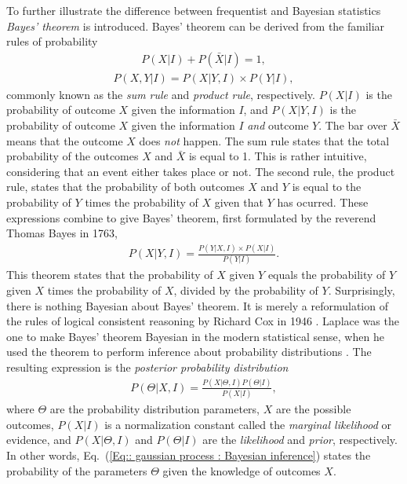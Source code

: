 \documentclass[twoside,english]{uiofysmaster}
\begin{document}
To further illustrate the difference between frequentist and Bayesian statistics \textit{Bayes' theorem} \cite{mr1763essay} is introduced. Bayes' theorem can be derived from the familiar rules of probability
\begin{align}\label{Eq:: Sum rule}
P(X | I) + P(\bar{X} | I) = 1,
\end{align}
\begin{align}\label{Eq:: Product rule}
P(X, Y | I) = P(X | Y, I) \times P(Y | I),
\end{align} 
commonly known as the \textit{sum rule} and \textit{product rule}, respectively. $P(X|I)$ is the probability of outcome $X$ given the information $I$, and $P(X|Y,I)$ is the probability of outcome $X$ given the information $I$ \textit{and} outcome $Y$. The bar over $\bar{X}$ means that the outcome $X$ does \textit{not} happen. The sum rule states that the total probability of the outcomes $X$ and $\bar{X}$ is equal to 1. This is rather intuitive, considering that an event either takes place or not. The second rule, the product rule, states that the probability of both outcomes $X$ and $Y$ is equal to the probability of $Y$ times the probability of $X$ given that $Y$ has ocurred. These expressions combine to give Bayes' theorem, first formulated by the reverend Thomas Bayes in 1763,
\begin{align}\label{Eq:: gaussian process : Bayes theorem}
P(X | Y, I) = \frac{P(Y | X, I) \times P(X | I)}{P(Y | I)}.
\end{align}
This theorem states that the probability of $X$ given $Y$ equals the probability of $Y$ given $X$ times the probability of $X$, divided by the probability of $Y$. Surprisingly, there is nothing Bayesian about Bayes' theorem. It is merely a reformulation of the rules of logical consistent reasoning by Richard Cox in 1946 \cite{sivia2006data}. Laplace was the one to make Bayes' theorem Bayesian in the modern statistical sense, when he used the theorem to perform inference about probability distributions \cite{laplace1820theorie}. The resulting expression is the \textit{posterior probability distribution}
\begin{align}
P(\Theta | X , I) = \frac{P(X|\Theta, I) P(\Theta| I)}{P(X | I)},\label{Eq:: gaussian process : Bayesian inference}
\end{align}
where $\Theta$ are the probability distribution parameters, $X$ are the possible outcomes, $P(X|I)$ is a normalization constant called the \textit{marginal likelihood} or evidence, and $P(X|\Theta, I)$  and $P(\Theta |I)$ are the \textit{likelihood} and \textit{prior}, respectively. In other words, Eq.\ (\ref{Eq:: gaussian process : Bayesian inference}) states the probability of the parameters $\Theta$ given the knowledge of outcomes $X$.
\end{document}

